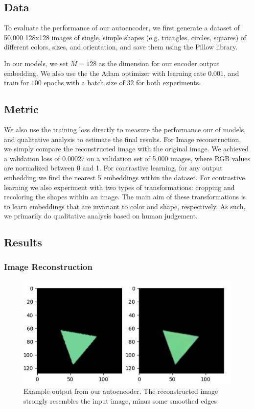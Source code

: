 \documentclass{article}
\begin{document}
\subsection{Data}
To evaluate the performance of our autoencoder, we first generate a dataset of 50,000 128x128 images of single, simple shapes (e.g. triangles, circles, squares) of different colors, sizes, and orientation, and save them using the Pillow library. 

In our models, we set $M = 128$ as the dimension for our encoder output embedding. We also use the the Adam optimizer with learning rate $0.001$, and train for $100$ epochs with a batch size of $32$ for both experiments. 

\subsection{Metric} We also use the training loss directly to measure the performance our of models, and qualitative analysis to estimate the final results. For Image reconstruction, we simply compare the reconstructed image with the original image. We achieved a validation loss of 0.00027 on a validation set of 5,000 images, where RGB values are normalized between 0 and 1. For contrastive learning, for any output embedding we find the nearest 5 embeddings within the dataset. For contrastive learning we also experiment with two types of transformations: cropping and recoloring the shapes within an image. The main aim of these transformations is to learn embeddings that are invariant to color and shape, respectively. As such, we primarily do qualitative analysis based on human judgement.

\subsection{Results}

\subsubsection{Image Reconstruction}

\begin{figure}
\includegraphics[scale=0.5]{autoencoder_results.png}
\caption{Example output from our autoencoder. The reconstructed image strongly resembles the input image, minus some smoothed edges}\label{fig:autoencoder_res} 
\end{figure}
\end{document}
